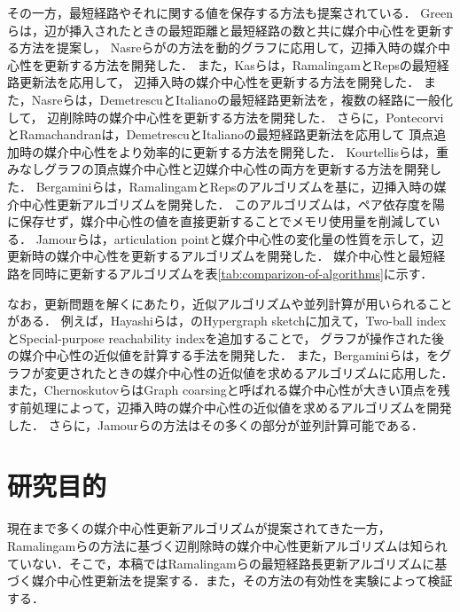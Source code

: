 その一方，最短経路やそれに関する値を保存する方法も提案されている．
Greenら\cite{Green2012}は，辺が挿入されたときの最短距離と最短経路の数と共に媒介中心性を更新する方法を提案し，
Nasreらが\cite{Karger1993}の方法を動的グラフに応用して，辺挿入時の媒介中心性を更新する方法を開発した\cite{Nasre2014a}．
また，Kasら\cite{Kas2013}は，RamalingamとRepsの最短経路更新法\cite{Ramalingam1996}を応用して，
辺挿入時の媒介中心性を更新する方法を開発した．
また，Nasreら\cite{Nasre2014b}は，DemetrescuとItalianoの最短経路更新法\cite{Demetrescu2003}を，複数の経路に一般化して，
辺削除時の媒介中心性を更新する方法を開発した．
さらに，PontecorviとRamachandran\cite{Pontecorvi2015}は，DemetrescuとItalianoの最短経路更新法を応用して
頂点追加時の媒介中心性をより効率的に更新する方法を開発した．
Kourtellisらは，重みなしグラフの頂点媒介中心性と辺媒介中心性の両方を更新する方法を開発した\cite{Kourtellis2015}．
Bergaminiらは，RamalingamとRepsのアルゴリズムを基に，辺挿入時の媒介中心性更新アルゴリズムを開発した\cite{Bergamini2017}．
このアルゴリズムは，ペア依存度を陽に保存せず，媒介中心性の値を直接更新することでメモリ使用量を削減している．
Jamourらは，articulation pointと媒介中心性の変化量の性質を示して，辺更新時の媒介中心性を更新するアルゴリズムを開発した\cite{Jamour2017}．
媒介中心性と最短経路を同時に更新するアルゴリズムを表\ref{tab:comparizon-of-algorithms}に示す．

なお，更新問題を解くにあたり，近似アルゴリズムや並列計算が用いられることがある．
例えば，Hayashiらは，\cite{Yoshida2014}のHypergraph sketchに加えて，Two-ball indexとSpecial-purpose reachability indexを追加することで，
グラフが操作された後の媒介中心性の近似値を計算する手法を開発した\cite{Hayashi2015}．
また，Bergaminiらは，\cite{Riondato2014}をグラフが変更されたときの媒介中心性の近似値を求めるアルゴリズムに応用した\cite{Bergamini2015a,Bergamini2015b}．
また，ChernoskutovらはGraph coarsingと呼ばれる媒介中心性が大きい頂点を残す前処理によって，辺挿入時の媒介中心性の近似値を求めるアルゴリズムを開発した\cite{Chernoskutov2015}．
さらに，Jamourらの方法\cite{Jamour2017}はその多くの部分が並列計算可能である．

\section{研究目的}
現在まで多くの媒介中心性更新アルゴリズムが提案されてきた一方，
Ramalingamらの方法に基づく辺削除時の媒介中心性更新アルゴリズムは知られていない．そこで，本稿ではRamalingamらの最短経路長更新アルゴリズムに基づく媒介中心性更新法を提案する．また，その方法の有効性を実験によって検証する．

